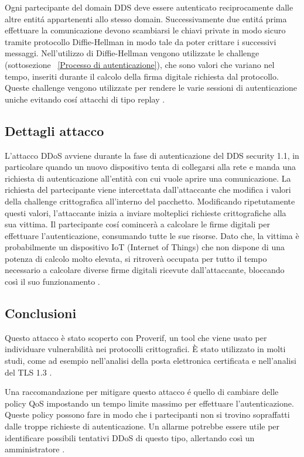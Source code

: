 Ogni partecipante del domain DDS deve essere autenticato reciprocamente
dalle altre entitá appartenenti allo stesso domain.
Successivamente due entitá
prima effettuare la comunicazione devono scambiarsi le chiavi private
in modo
sicuro tramite protocollo Diffie-Hellman in modo tale da poter 
crittare i successivi
messaggi. Nell'utilizzo di Diffie-Hellman vengono utilizzate
le challenge (sottosezione ~\ref{Processo di autenticazione}), 
che sono valori che variano nel tempo, inseriti durante il calcolo
della firma digitale richiesta dal protocollo. 
Queste challenge vengono utilizzate per rendere le varie sessioni 
di autenticazione uniche evitando cosí attacchi di tipo replay
\cite{DBLP:conf/asiaccs/WangLG24}.



\subsection{Dettagli attacco}
L'attacco DDoS avviene durante la fase di autenticazione del
DDS security 1.1, in particolare quando un nuovo dispositivo tenta di
collegarsi alla rete e manda una richiesta di autenticazione
all'entità con cui vuole aprire una comunicazione. 
La richiesta del partecipante viene intercettata
dall'attaccante che modifica i valori della challenge crittografica 
all'interno del pacchetto. Modificando ripetutamente questi valori, l'attaccante
inizia a inviare molteplici richieste crittografiche alla sua vittima.
Il partecipante cosí comincerà a calcolare le firme digitali per effettuare
l'autenticazione, consumando tutte le sue risorse.
Dato che, la vittima è probabilmente un dispositivo IoT
(Internet of Things)
che non dispone di una potenza di calcolo molto elevata, si ritroverà
occupata per tutto il tempo necessario a calcolare diverse firme digitali
ricevute dall'attaccante, bloccando così il suo funzionamento
\cite{DBLP:conf/asiaccs/WangLG24}.


\subsection{Conclusioni}
Questo attacco è stato scoperto con Proverif, un tool che viene usato
per individuare vulnerabilità nei protocolli crittografici. 
È stato utilizzato in molti studi, come ad esempio nell'analisi della 
posta elettronica certificata e nell'analisi del TLS 1.3 \cite{proverifmanual}.

Una raccomandazione per mitigare questo attacco é quello di cambiare delle
policy QoS impostando un tempo limite massimo per effettuare
l'autenticazione. Queste policy possono fare in modo
che i partecipanti non si trovino sopraffatti dalle troppe richieste di
autenticazione. Un allarme potrebbe essere utile per identificare possibili
tentativi DDoS di questo tipo, allertando così un amministratore
\cite{DBLP:conf/asiaccs/WangLG24}.


